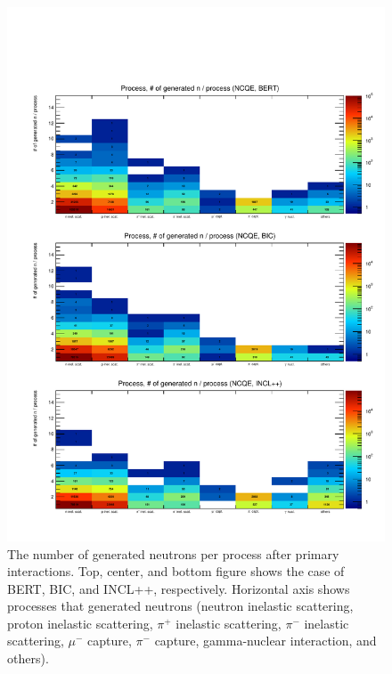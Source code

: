 \begin{figure}[p]
	\centering
	\includegraphics[width=15cm]{PDF/Secondary/Comparison/onlyNCQE_neutron/pdf2/Logz_Pro_NumSec_ncqe}
	\caption[The number of generated neutrons per process after primary interactions]{
	The number of generated neutrons per process after primary interactions.
	Top, center, and bottom figure shows the case of BERT, BIC, and INCL++, respectively.
	Horizontal axis shows processes that generated neutrons (neutron inelastic scattering, proton inelastic scattering, $\pi^{+}$ inelastic scattering, $\pi^{-}$ inelastic scattering, $\mu^{-}$ capture, $\pi^{-}$ capture, gamma-nuclear interaction, and others).
	}\label{neutron_Logz_Pro_NumSec_ncqe}
\end{figure}

